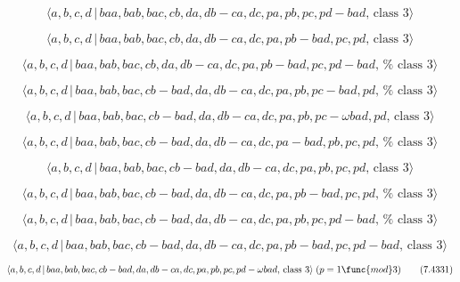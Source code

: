 \documentclass[10pt]{article}
\begin{document}
\begin{equation}
\langle a,b,c,d\,|\,baa,bab,bac,cb,da,db-ca,dc,pa,pb,pc,pd-bad,\,\text{class 
}3\rangle  \tag{7.4321}
\end{equation}

\begin{equation}
\langle a,b,c,d\,|\,baa,bab,bac,cb,da,db-ca,dc,pa,pb-bad,pc,pd,\,\text{class 
}3\rangle  \tag{7.4322}
\end{equation}

\begin{equation}
\langle a,b,c,d\,|\,baa,bab,bac,cb,da,db-ca,dc,pa,pb-bad,pc,pd-bad,\,\text{%
class }3\rangle  \tag{7.4323}
\end{equation}

\begin{equation}
\langle a,b,c,d\,|\,baa,bab,bac,cb-bad,da,db-ca,dc,pa,pb,pc-bad,pd,\,\text{%
class }3\rangle  \tag{7.4324}
\end{equation}

\begin{equation}
\langle a,b,c,d\,|\,baa,bab,bac,cb-bad,da,db-ca,dc,pa,pb,pc-\omega bad,pd,\,%
\text{class }3\rangle  \tag{7.4325}
\end{equation}

\begin{equation}
\langle a,b,c,d\,|\,baa,bab,bac,cb-bad,da,db-ca,dc,pa-bad,pb,pc,pd,\,\text{%
class }3\rangle  \tag{7.4326}
\end{equation}

\begin{equation}
\langle a,b,c,d\,|\,baa,bab,bac,cb-bad,da,db-ca,dc,pa,pb,pc,pd,\,\text{class 
}3\rangle  \tag{7.4327}
\end{equation}

\begin{equation}
\langle a,b,c,d\,|\,baa,bab,bac,cb-bad,da,db-ca,dc,pa,pb-bad,pc,pd,\,\text{%
class }3\rangle  \tag{7.4328}
\end{equation}

\begin{equation}
\langle a,b,c,d\,|\,baa,bab,bac,cb-bad,da,db-ca,dc,pa,pb,pc,pd-bad,\,\text{%
class }3\rangle  \tag{7.4329}
\end{equation}

\begin{equation}
\langle a,b,c,d\,|\,baa,bab,bac,cb-bad,da,db-ca,dc,pa,pb-bad,pc,pd-bad,\,%
\text{class }3\rangle  \tag{7.4330}
\end{equation}

\begin{equation}
\langle a,b,c,d\,|\,baa,bab,bac,cb-bad,da,db-ca,dc,pa,pb,pc,pd-\omega bad,\,%
\text{class }3\rangle \;(p=1\func{mod}3)  \tag{7.4331}
\end{equation}
\end{document}

